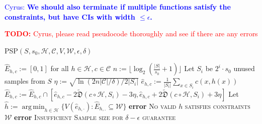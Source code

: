 \documentclass{article}
\newcommand\todo[1]{\textcolor{red}{\textbf{TODO:} #1}}
\newcommand{\md}{\mathfrak{D}}
\newcommand{\emd}{\tilde{\md}}
\DeclareMathOperator*{\argmin}{arg\,min}
\newcommand{\cc}[1]{\textcolor{blue}{Cyrus: \textbf{#1}}}
\begin{document}
{\cc{We should also terminate if multiple functions satisfy the constraints, but have CIs with width $\leq \epsilon$.}

\todo{Cyrus, please read pseudocode thoroughly and see if there are any errors}

\begin{algorithm}
    \caption{PSP$(S, s_0, \mathcal{H}, \mathcal{C}, V, \mathcal{W}, \epsilon, \delta)$}\label{euclid}
    \begin{algorithmic}
        \State  $\hat{E}_{h, c} := [0,1]$ for all $h \in \mathcal{H}, c \in \mathcal{C}$
        \State $n := \lfloor \log_2(\frac{|S|}{s_0} + 1)\rfloor$ 
            \State Let $S_i$ be $2^i \cdot s_0$ unused samples from $S$
            \State $\eta := \sqrt{\ln(2n |\mathcal{C}| / \delta) / 2|S_i|}$ 
             
                \State $\hat{e}_{h, c} := \frac{1}{|S_i|} \sum_{x \in S_i} c(x,h(x))$
                \State $\hat{E}_{h, c} := \hat{E}_{h,c} \cap [\hat{e}_{h,c} - 2 \emd(c \circ \mathcal{H}, S_i) - 3\eta, \hat{e}_{h,c} + 2 \emd(c \circ \mathcal{H}, S_i) + 3\eta]$
            \EndFor
            Let $\hat{h} := \argmin_{h \in \mathcal{H}} \{V(\hat{e}_{h,\cdot}): \hat{E}_{h, .} \subseteq \mathcal{W} \}$ 
                \EndIf
            \EndFor
                \State \textbf{error} \textsc{No valid $h$ satisfies constraints $\mathcal{W}$}
            \EndIf
        \EndFor
        \State \textbf{error} \textsc{Insufficient Sample size for $\delta-\epsilon$ guarantee}
    \end{algorithmic}
\end{algorithm}

}
\end{document}
